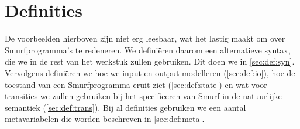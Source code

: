 \section{Definities}
\label{sec:def}

De voorbeelden hierboven zijn niet erg leesbaar, wat het lastig maakt om over
Smurfprogramma's te redeneren. We defini\"eren daarom een alternatieve syntax,
die we in de rest van het werkstuk zullen gebruiken. Dit doen we in
\autoref{sec:def:syn}. Vervolgens defini\"eren we hoe we input en output
modelleren (\ref{sec:def:io}), hoe de toestand van een Smurfprogramma eruit
ziet (\ref{sec:def:state}) en wat voor transities we zullen gebruiken bij het
specificeren van Smurf in de natuurlijke semantiek (\ref{sec:def:trans}). Bij
al definities gebruiken we een aantal metavariabelen die worden beschreven in
\autoref{sec:def:meta}.






